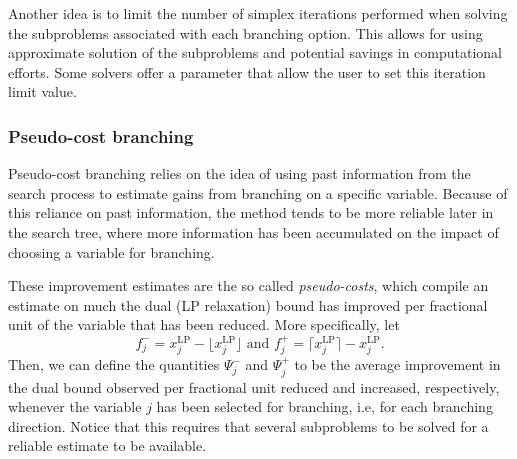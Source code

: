 Another idea is to limit the number of simplex iterations performed when solving the subproblems associated with each branching option. This allows for using approximate solution of the subproblems and potential savings in computational efforts. Some solvers offer a parameter that allow the user to set this iteration limit value.


\subsubsection{Pseudo-cost branching}

Pseudo-cost branching relies on the idea of using past information from the search process to estimate gains from branching on a specific variable. Because of this reliance on past information, the method tends to be more reliable later in the search tree, where more information has been accumulated on the impact of choosing a variable for branching.

These improvement estimates are the so called \emph{pseudo-costs}, which compile an estimate on much the dual (LP relaxation) bound has improved per fractional unit of the variable that has been reduced. More specifically, let 
%
\begin{equation} \label{p1c11:eq:fractionals}
	f^{-}_j = x^{\text{LP}}_j - \lfloor x^{\text{LP}}_j \rfloor \text{ and } f^{+}_j = \lceil x^{\text{LP}}_j \rceil - x^{\text{LP}}_j.	
\end{equation}
%
Then, we can define the quantities $\Psi^-_j$ and $\Psi^+_j$ to be the average improvement in the dual bound observed per fractional unit reduced and increased, respectively, whenever the variable $j$ has been selected for branching, i.e, for each branching direction. Notice that this requires that several subproblems to be solved for a reliable estimate to be available.


